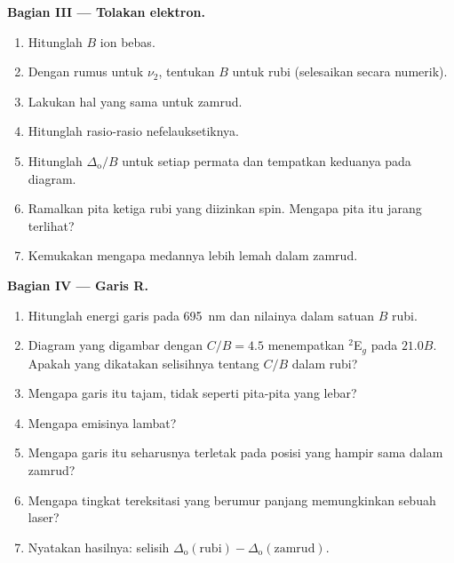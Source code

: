 \begin{problem}
\medskip\noindent\textbf{Bagian III --- Tolakan elektron.}
\begin{enumerate}[resume, beginpenalty=10000]
  \item Hitunglah $B$ ion bebas.
  \item Dengan rumus untuk $\nu_2$, tentukan $B$ untuk rubi (selesaikan secara numerik).
  \item Lakukan hal yang sama untuk zamrud.
  \item Hitunglah rasio-rasio nefelauksetiknya.
  \item Hitunglah $\Delta_{\mathrm o}/B$ untuk setiap permata dan tempatkan keduanya pada diagram.
  \item Ramalkan pita ketiga rubi yang diizinkan spin. Mengapa pita itu jarang terlihat?
  \item Kemukakan mengapa medannya lebih lemah dalam zamrud.
\end{enumerate}

\medskip\noindent\textbf{Bagian IV --- Garis R.}
\begin{enumerate}[resume, beginpenalty=10000]
  \item Hitunglah energi garis pada \qty{695}{nm} dan nilainya dalam satuan $B$ rubi.
  \item Diagram yang digambar dengan $C/B = 4.5$ menempatkan $^2$E$_g$ pada $21.0B$. Apakah yang dikatakan
        selisihnya tentang $C/B$ dalam rubi?
  \item Mengapa garis itu tajam, tidak seperti pita-pita yang lebar?
  \item Mengapa emisinya lambat?
  \item Mengapa garis itu seharusnya terletak pada posisi yang hampir sama dalam zamrud?
  \item Mengapa tingkat tereksitasi yang berumur panjang memungkinkan sebuah laser?
  \item Nyatakan hasilnya: selisih $\Delta_{\mathrm o}(\text{rubi}) - \Delta_{\mathrm o}(\text{zamrud})$.
\end{enumerate}
\end{problem}
